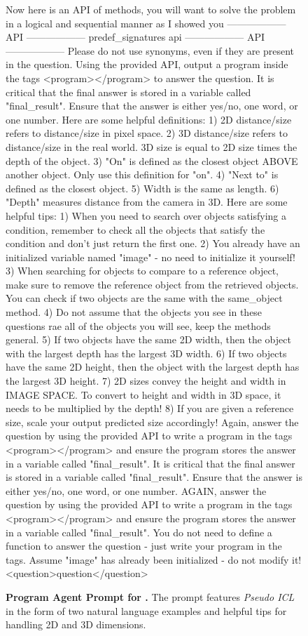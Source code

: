 \begin{figure*}[t]
\begin{prompt}
Now here is an API of methods, you will want to solve the problem in a logical and sequential manner as I showed you
------------------ API ------------------
{predef_signatures}
{api}
------------------ API ------------------
Please do not use synonyms, even if they are present in the question.
Using the provided API, output a program inside the tags <program></program> to answer the question. 
It is critical that the final answer is stored in a variable called "final_result".
Ensure that the answer is either yes/no, one word, or one number.
Here are some helpful definitions:
1) 2D distance/size refers to distance/size in pixel space.
2) 3D distance/size refers to distance/size in the real world. 3D size is equal to 2D size times the depth of the object.
3) "On" is defined as the closest object ABOVE another object. Only use this definition for "on".
4) "Next to" is defined as the closest object.
5) Width is the same as length.
6) "Depth" measures distance from the camera in 3D.
Here are some helpful tips: 
1) When you need to search over objects satisfying a condition, remember to check all the objects that satisfy the condition and don't just return the first one. 
2) You already have an initialized variable named "image" - no need to initialize it yourself! 
3) When searching for objects to compare to a reference object, make sure to remove the reference object from the retrieved objects. You can check if two objects are the same with the same_object method.
4) Do not assume that the objects you see in these questions rae all of the objects you will see, keep the methods general.
5) If two objects have the same 2D width, then the object with the largest depth has the largest 3D width.
6) If two objects have the same 2D height, then the object with the largest depth has the largest 3D height.
7) 2D sizes convey the height and width in IMAGE SPACE. To convert to height and width in 3D space, it needs to be multiplied by the depth!
8) If you are given a reference size, scale your output predicted size accordingly!
Again, answer the question by using the provided API to write a program in the tags <program></program> and ensure the program stores the answer in a variable called "final_result".
It is critical that the final answer is stored in a variable called "final_result".
Ensure that the answer is either yes/no, one word, or one number.
AGAIN, answer the question by using the provided API to write a program in the tags <program></program> and ensure the program stores the answer in a variable called "final_result".
You do not need to define a function to answer the question - just write your program in the tags. Assume "image" has already been initialized - do not modify it!
<question>{question}</question>
\end{prompt}
\caption{\textbf{Program Agent Prompt for \ourbench.} The prompt features \emph{Pseudo ICL} in the form of two natural language examples and helpful tips for handling 2D and 3D dimensions.}
\label{fig:program_prompt_omni3d}
\end{figure*}